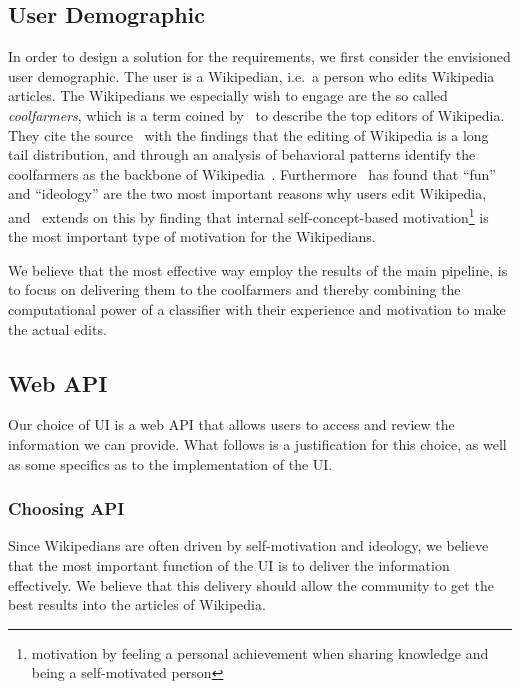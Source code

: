\subsection{User Demographic}

In order to design a solution for the requirements, we first consider the envisioned user demographic. The user is a Wikipedian, i.e.\ a person who edits Wikipedia articles. The Wikipedians we especially wish to engage are the so called \emph{coolfarmers}, which is a term coined by~\cite{coolfarming} to describe the top editors of Wikipedia. They cite the source~\cite{Priedhorsky:2007:CDR:1316624.1316663} with the findings that the editing of Wikipedia is a long tail distribution, and through an analysis of behavioral patterns identify the coolfarmers as the backbone of Wikipedia~\cite{coolfarming}. Furthermore~\cite{wiki_motivation} has found that \enquote{fun} and \enquote{ideology} are the two most important reasons why users edit Wikipedia, and~\cite{Yang20101377} extends on this by finding that internal self-concept-based motivation\footnote{motivation by feeling a personal achievement when sharing knowledge and being a self-motivated person} is the most important type of motivation for the Wikipedians.

We believe that the most effective way employ the results of the main pipeline, is to focus on delivering them to the coolfarmers and thereby combining the computational power of a classifier with their experience and motivation to make the actual edits.


\subsection{Web API}

Our choice of UI is a web API that allows users to access and review the information we can provide. What follows is a justification for this choice, as well as some specifics as to the implementation of the UI\@. 

\subsubsection{Choosing API}
Since Wikipedians are often driven by self-motivation and ideology, we believe that the most important function of the UI is to deliver the information effectively. We believe that this delivery should allow the community to get the best results into the articles of Wikipedia.

